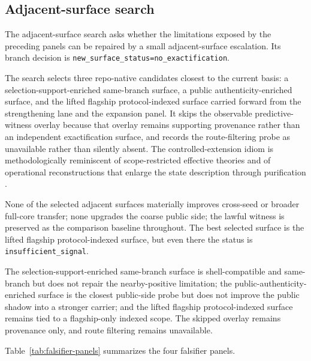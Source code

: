 \documentclass[11pt]{article}
\theoremstyle{definition}
\begin{document}
\subsection{Adjacent-surface search}

The adjacent-surface search asks whether the limitations exposed by the preceding
panels can be repaired by a small adjacent-surface escalation. Its branch decision is
\nolinkurl{new_surface_status=no_exactification}.

The search selects three repo-native candidates closest to the current basis: a
selection-support-enriched same-branch surface, a public authenticity-enriched
surface, and the lifted flagship protocol-indexed surface carried forward from the
strengthening lane and the expansion panel. It skips the observable predictive-witness
overlay because that overlay remains supporting provenance rather than an independent
exactification surface, and records the route-filtering probe as unavailable rather
than silently absent. The controlled-extension idiom is methodologically reminiscent
of scope-restricted effective theories \citep{Crowther2016} and of operational
reconstructions that enlarge the state description through purification
\citep{ChiribellaDArianoPerinotti2010}.

None of the selected adjacent surfaces materially improves cross-seed or broader
full-core transfer; none upgrades the coarse public side; the lawful witness is
preserved as the comparison baseline throughout. The best selected surface is the
lifted flagship protocol-indexed surface, but even there the status is
\texttt{insufficient\_signal}.

The selection-support-enriched same-branch surface is shell-compatible and
same-branch but does not repair the nearby-positive limitation; the
public-authenticity-enriched surface is the closest public-side probe but does not
improve the public shadow into a stronger carrier; and the lifted flagship
protocol-indexed surface remains tied to a flagship-only indexed scope. The skipped
overlay remains provenance only, and route filtering remains unavailable.

Table~\ref{tab:falsifier-panels} summarizes the four falsifier panels.
\end{document}
